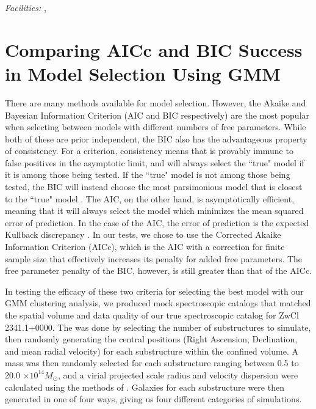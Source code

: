 \documentclass[onecolumn]{aastex}
\begin{document}
{\it Facilities:} , 


\appendix

\section{Comparing AICc and BIC Success in Model Selection Using GMM}
There are many methods available for model selection.  However, the Akaike and Bayesian Information Criterion (AIC and BIC respectively) are the most popular when selecting between models with different numbers of free parameters.  While both of these are prior independent, the BIC also has the advantageous property of consistency.  For a criterion, consistency means that is provably immune to false positives in the asymptotic limit, and will always select the ``true" model if it is among those being tested.  If the ``true" model is not among those being tested, the BIC will instead choose the most parsimonious model that is closest to the ``true" model \citep{Claeskens08}.  The AIC, on the other hand, is asymptotically efficient, meaning that it will always select the model which minimizes the mean squared error of prediction.  In the case of the AIC, the error of prediction is the expected Kullback discrepancy \citep{Cavanaugh11}.  In our tests, we chose to use the Corrected Akaike Information Criterion (AICc), which is the AIC with a correction for finite sample size that effectively increases its penalty for added free parameters.  The free parameter penalty of the BIC, however, is still greater than that of the AICc.

In testing the efficacy of these two criteria for selecting the best model with our GMM clustering analysis, we produced mock spectroscopic catalogs that matched the spatial volume and data quality of our true spectroscopic catalog for ZwCl 2341.1+0000.  The was done by selecting the number of substructures to simulate, then randomly generating the central positions (Right Ascension, Declination, and mean radial velocity) for each substructure within the confined volume.  A mass was then randomly selected for each substructure ranging between 0.5 to 20.0 $\times 10^{14} M_{\odot}$, and a virial projected scale radius and velocity dispersion were calculated using the methods of \cite{Girardi01}.  Galaxies for each substructure were then generated in one of four ways, giving us four different categories of simulations.
\end{document}
